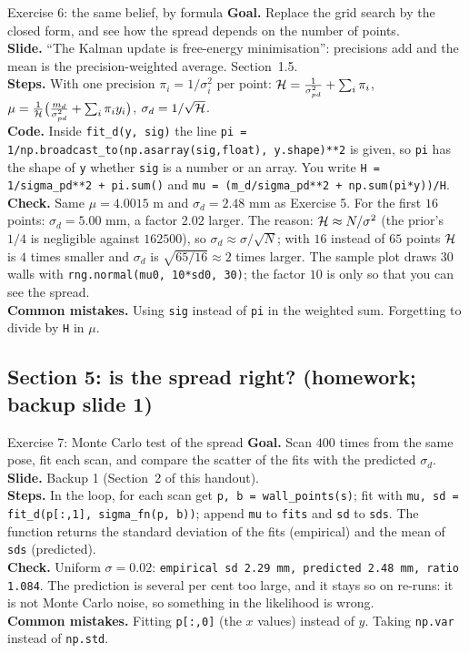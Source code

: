 \documentclass[11pt]{article}
\begin{document}
\begin{labhelp}{Exercise 6: the same belief, by formula}
\textbf{Goal.} Replace the grid search by the closed form, and see how the spread depends on the number of points.\\
\textbf{Slide.} ``The Kalman update is free-energy minimisation'': precisions add and the mean is the precision-weighted average. Section~1.5.\\
\textbf{Steps.} With one precision $\pi_i=1/\sigma_i^2$ per point: $\mathcal{H}=\frac{1}{\sigma_{pd}^2}+\sum_i\pi_i$, $\mu=\frac1{\mathcal{H}}\big(\frac{m_d}{\sigma_{pd}^2}+\sum_i\pi_iy_i\big)$, $\sigma_d=1/\sqrt{\mathcal{H}}$.\\
\textbf{Code.} Inside \texttt{fit\_d(y, sig)} the line \texttt{pi = 1/np.broadcast\_to(np.asarray(sig,float), y.shape)**2} is given, so \texttt{pi} has the shape of \texttt{y} whether \texttt{sig} is a number or an array. You write \texttt{H = 1/sigma\_pd**2 + pi.sum()} and \texttt{mu = (m\_d/sigma\_pd**2 + np.sum(pi*y))/H}.\\
\textbf{Check.} Same $\mu=4.0015$ m and $\sigma_d=2.48$ mm as Exercise 5. For the first $16$ points: $\sigma_d=5.00$ mm, a factor $2.02$ larger. The reason: $\mathcal{H}\approx N/\sigma^2$ (the prior's $1/4$ is negligible against $162500$), so $\sigma_d\approx\sigma/\sqrt N$; with $16$ instead of $65$ points $\mathcal{H}$ is $4$ times smaller and $\sigma_d$ is $\sqrt{65/16}\approx2$ times larger. The sample plot draws $30$ walls with \texttt{rng.normal(mu0, 10*sd0, 30)}; the factor $10$ is only so that you can see the spread.\\
\textbf{Common mistakes.} Using \texttt{sig} instead of \texttt{pi} in the weighted sum. Forgetting to divide by \texttt{H} in $\mu$.
\end{labhelp}

\subsection*{Section 5: is the spread right? (homework; backup slide 1)}

\begin{labhelp}{Exercise 7: Monte Carlo test of the spread}
\textbf{Goal.} Scan $400$ times from the same pose, fit each scan, and compare the scatter of the fits with the predicted $\sigma_d$.\\
\textbf{Slide.} Backup 1 (Section~2 of this handout).\\
\textbf{Steps.} In the loop, for each scan get \texttt{p, b = wall\_points(s)}; fit with \texttt{mu, sd = fit\_d(p[:,1], sigma\_fn(p, b))}; append \texttt{mu} to \texttt{fits} and \texttt{sd} to \texttt{sds}. The function returns the standard deviation of the fits (empirical) and the mean of \texttt{sds} (predicted).\\
\textbf{Check.} Uniform $\sigma=0.02$: \texttt{empirical sd 2.29 mm, predicted 2.48 mm, ratio 1.084}. The prediction is several per cent too large, and it stays so on re-runs: it is not Monte Carlo noise, so something in the likelihood is wrong.\\
\textbf{Common mistakes.} Fitting \texttt{p[:,0]} (the $x$ values) instead of $y$. Taking \texttt{np.var} instead of \texttt{np.std}.
\end{labhelp}
\end{document}
